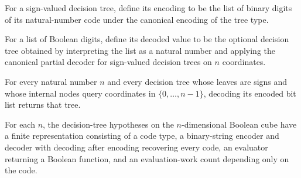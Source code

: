 \begin{definition}
\label{FABL.DecisionTreeHypothesis.encode}
\leanok
{}
For a sign-valued decision tree, define its encoding to be the list of binary digits of
its natural-number code under the canonical encoding of the tree type.
\end{definition}

\begin{definition}
\label{FABL.DecisionTreeHypothesis.decode}
\leanok
{}
For a list of Boolean digits, define its decoded value to be the optional decision tree
obtained by interpreting the list as a natural number and applying the canonical partial
decoder for sign-valued decision trees on $n$ coordinates.
\end{definition}

\begin{theorem}
\label{FABL.DecisionTreeHypothesis.decode_encode}
\leanok
{}
For every natural number $n$ and every decision tree whose leaves are signs and whose
internal nodes query coordinates in $\{0,\ldots,n-1\}$, decoding its encoded bit list
returns that tree.
\end{theorem}

\begin{definition}
\label{FABL.DecisionTreeHypothesis.finiteRepresentation}
\leanok
{}
For each $n$, the decision-tree hypotheses on the $n$-dimensional Boolean cube have a
finite representation consisting of a code type, a binary-string encoder and decoder
with decoding after encoding recovering every code, an evaluator returning a Boolean
function, and an evaluation-work count depending only on the code.
\end{definition}
